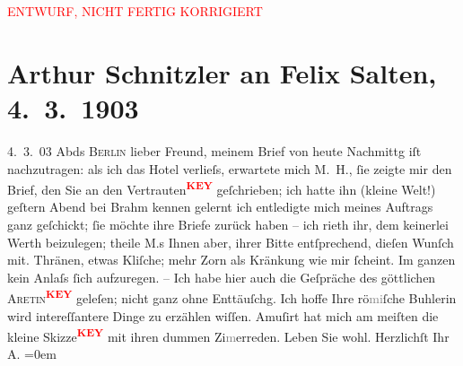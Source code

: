 
\begin{center}
            \textcolor{red}{ENTWURF, NICHT FERTIG KORRIGIERT}
                      \end{center}
            
         
         \renewcommand{\erwaehntePersonen}{Personen: Otto Brahm, Mirjam Horwitz, Felix Salten}
         \renewcommand{\erwaehnteOrte}{Orte: Berlin, Wien}
         \renewcommand{\erwaehnteWerke}{}
               \section[Arthur Schnitzler an Felix Salten, 4. 3. 1903]{ Arthur Schnitzler an Felix Salten, 4. 3. 1903}\nopagebreak{}\rehead{ }\begin{ledgroupsized}[t]{13cm}\normalsize\beginnumbering \toendnotes[C]{\smallbreak\pagebreak[2]} 
\toendnotes[C]{\smallbreak}\pstart
           \raggedleft{}{\pb}4. 3. 03\pend
           \pstart
           Abds{ }\textsc{Berlin}\pend
           \pstart
           lieber Freund, meinem Brief von heute Nachmittg iſt nachzutragen:
               als ich das Hotel verlieſs, erwartete mich M. H., ſie
               zeigte mir den Brief, den Sie an den Vertrauten\textcolor{red}{\textsuperscript{\textbf{KEY}}}
               geſchrieben; ich hatte ihn (kleine Welt!) geſtern Abend bei Brahm kennen gelernt{\dotstwo} ich entledigte mich meines Auftrags
               ganz geſchickt; ſie {\pb} möchte ihre
               Briefe zurück haben – ich rieth ihr, dem keinerlei Werth beizulegen; theile M.s Ihnen aber, ihrer Bitte entſprechend,
               dieſen Wunſch mit. Thränen, etwas Kliſche; mehr Zorn als Kränkung wie mir ſcheint. Im
               ganzen kein Anlaſs ſich aufzuregen. \pend
           \pstart
           – Ich habe hier auch die Geſpräche des göttlichen
               {\pb}\textsc{Aretin}\textcolor{red}{\textsuperscript{\textbf{KEY}}}
                geleſen; nicht ganz ohne Enttäuſchg. Ich hoffe Ihre rö\textcolor{gray}{mi}ſche
               Buhlerin wird intereſſantere Dinge zu erzählen wiſſen. Amuſirt hat mich am meiſten
               die kleine Skizze\textcolor{red}{\textsuperscript{\textbf{KEY}}} mit ihren dummen
               Zi\textcolor{gray}{m}erreden. \pend
           \pstart
           Leben Sie wohl. Herzlichſt Ihr {\\[\baselineskip]}\spacefill\mbox{A.}\pend
           \leftskip=0em{}
         

\end{ledgroupsized}
